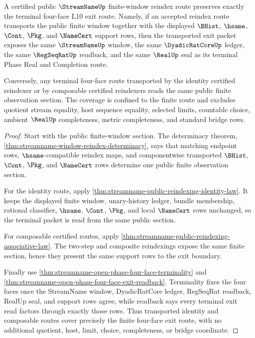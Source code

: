 \begin{theorem}
\label{thm:streamname-reindex-terminal-coverage}
A certified public $\StreamNameUp$ finite-window reindex route preserves exactly
the terminal four-face L10 exit route. Namely, if an accepted reindex route
transports the public finite window together with the displayed $\BHist$,
$\hsame$, $\Cont$, $\Pkg$, and $\NameCert$ support rows, then the transported
exit packet exposes the same $\StreamNameUp$ window, the same
$\DyadicRatCoreUp$ ledger, the same $\RegSeqRatUp$ readback, and the same
$\RealUp$ seal as its terminal Phase Real and Completion route.

Conversely, any terminal four-face route transported by the identity certified
reindexer or by composable certified reindexers reads the same public finite
observation section. The coverage is confined to the finite route and excludes
quotient stream equality, host sequence equality, selected limits, countable
choice, ambient $\RealUp$ completeness, metric completeness, and standard
bridge rows.
\end{theorem}
\begin{proof}
Start with the public finite-window section. The determinacy theorem,
\autoref{thm:streamname-window-reindex-determinacy}, says that matching
endpoint rows, $\hsame$-compatible reindex maps, and componentwise transported
$\BHist$, $\Cont$, $\Pkg$, and $\NameCert$ rows determine one public finite
observation section.

For the identity route, apply
\autoref{thm:streamname-public-reindexing-identity-law}. It keeps the displayed
finite window, unary-history ledger, bundle membership, rational classifier,
$\hsame$, $\Cont$, $\Pkg$, and local $\NameCert$ rows unchanged, so the
terminal packet is read from the same public section.

For composable certified routes, apply
\autoref{thm:streamname-public-reindexing-associative-law}. The two-step and
composite reindexings expose the same finite section, hence they present the
same support rows to the exit boundary.

Finally use \autoref{thm:streamname-open-phase-four-face-terminality} and
\autoref{thm:streamname-open-phase-four-face-exit-readback}. Terminality fixes
the four faces once the StreamName window, DyadicRatCore ledger, RegSeqRat
readback, RealUp seal, and support rows agree, while readback says every
terminal exit read factors through exactly those rows. Thus transported
identity and composable routes cover precisely the finite four-face exit route,
with no additional quotient, host, limit, choice, completeness, or bridge
coordinate.
\end{proof}

